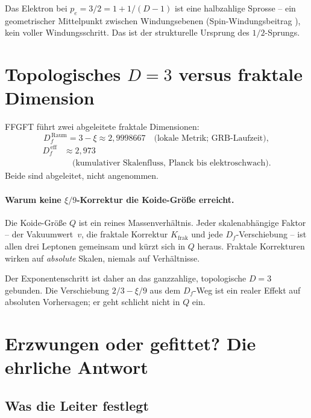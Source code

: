 Das Elektron bei \(p_e = 3/2 = 1 + 1/(D-1)\) ist eine halbzahlige
Sprosse -- ein geometrischer Mittelpunkt zwischen Windungsebenen
(Spin-Windungsbeitrag \cite{PascherDok051}), kein voller Windungsschritt. Das ist der
strukturelle Ursprung des \(1/2\)-Sprungs.

\section{Topologisches \(D=3\) versus fraktale Dimension}
\label{sec:df}

FFGFT führt zwei abgeleitete fraktale Dimensionen:
\begin{equation}
  D_f^{\,\text{Raum}} = 3 - \xi \approx 2{,}9998667
  \quad\text{(lokale Metrik; GRB-Laufzeit)},
\end{equation}
\begin{align*}
  D_f^{\,\text{eff}} &\approx 2{,}973\\
  &\quad\text{(kumulativer Skalenfluss, Planck bis elektroschwach)}.
\end{align*}
Beide sind abgeleitet, nicht angenommen.

\paragraph{Warum keine \(\xi/9\)-Korrektur die Koide-Größe erreicht.}
Die Koide-Größe \(Q\) ist ein reines Massenverhältnis.
Jeder skalenabhängige Faktor --
der Vakuumwert~\(v\),
die fraktale Korrektur
\(K_{\text{frak}}\)
und jede \(D_f\)-Verschiebung --
ist allen drei Leptonen gemeinsam und kürzt sich in \(Q\) heraus.
Fraktale Korrekturen wirken auf \emph{absolute} Skalen, niemals auf
Verhältnisse.

Der Exponentenschritt ist daher an das ganzzahlige, topologische
\(D=3\) gebunden. Die Verschiebung \(2/3 - \xi/9\) aus dem
\(D_f\)-Weg ist ein realer Effekt auf absoluten Vorhersagen;
er geht schlicht nicht in \(Q\) ein.

\section{Erzwungen oder gefittet? Die ehrliche Antwort}

\subsection*{Was die Leiter festlegt}


